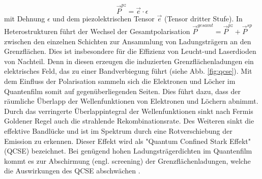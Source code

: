 %
\begin{equation}
    \vec{P}^{pz} = \vec{e} \cdot \epsilon
\end{equation}
%
mit Dehnung $\epsilon$ und dem piezolektrischen Tensor $\vec{e}$ (Tensor dritter Stufe).
\newline
In Heterostrukturen führt der Wechsel der Gesamtpolarisation $\vec{P}^{gesamt} = \vec{P}^{pz} + \vec{P}^{sp}$ zwischen den einzelnen Schichten zur Ansammlung von Ladungsträgern an den Grenzflächen. Dies ist insbesondere für die Effizienz von Leucht-und Laserdioden von Nachteil. Denn in diesen erzeugen die induzierten Grenzflächenladungen ein elektrisches Feld, das zu einer Bandverbiegung führt (siehe Abb. \ref{fig:qcse}). Mit dem Einfluss der Polarisation sammeln sich die Elektronen und Löcher im Quantenfilm somit auf gegenüberliegenden Seiten.
\newline
Dies führt dazu, dass der räumliche Überlapp der Wellenfunktionen von Elektronen und Löchern abnimmt. Durch das verringerte Überlappintegral der Wellenfunktionen sinkt nach Fermis Goldener Regel auch die strahlende Rekombinationsrate. Des Weiteren sinkt die effektive Bandlücke und ist im Spektrum durch eine Rotverschiebung der Emission zu erkennen. 
\newline
Dieser Effekt wird als "Quantum Confined Stark Effekt" (QCSE) bezeichnet. Bei genügend hohen Ladungsträgerdichten im Quantenfilm kommt es zur Abschirmung (engl. screening) der Grenzflächenladungen, welche die Auswirkungen des QCSE abschwächen \cite{doi:10.1063/1.2857467} \cite{1347-4065-36-4A-L382}.
